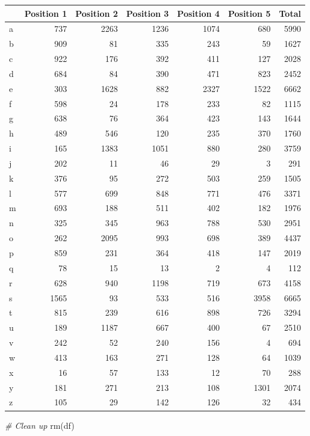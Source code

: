 \documentclass[
]{article}
\newenvironment{Shaded}{\begin{snugshade}}{\end{snugshade}}
\newcommand{\CommentTok}[1]{\textcolor[rgb]{0.56,0.35,0.01}{\textit{#1}}}
\newcommand{\FunctionTok}[1]{\textcolor[rgb]{0.00,0.00,0.00}{#1}}
\newcommand{\NormalTok}[1]{#1}
\begin{document}
\begin{longtable}[]{@{}lrrrrrr@{}}
\toprule
& Position 1 & Position 2 & Position 3 & Position 4 & Position 5 &
Total \\
\midrule
\endhead
a & 737 & 2263 & 1236 & 1074 & 680 & 5990 \\
b & 909 & 81 & 335 & 243 & 59 & 1627 \\
c & 922 & 176 & 392 & 411 & 127 & 2028 \\
d & 684 & 84 & 390 & 471 & 823 & 2452 \\
e & 303 & 1628 & 882 & 2327 & 1522 & 6662 \\
f & 598 & 24 & 178 & 233 & 82 & 1115 \\
g & 638 & 76 & 364 & 423 & 143 & 1644 \\
h & 489 & 546 & 120 & 235 & 370 & 1760 \\
i & 165 & 1383 & 1051 & 880 & 280 & 3759 \\
j & 202 & 11 & 46 & 29 & 3 & 291 \\
k & 376 & 95 & 272 & 503 & 259 & 1505 \\
l & 577 & 699 & 848 & 771 & 476 & 3371 \\
m & 693 & 188 & 511 & 402 & 182 & 1976 \\
n & 325 & 345 & 963 & 788 & 530 & 2951 \\
o & 262 & 2095 & 993 & 698 & 389 & 4437 \\
p & 859 & 231 & 364 & 418 & 147 & 2019 \\
q & 78 & 15 & 13 & 2 & 4 & 112 \\
r & 628 & 940 & 1198 & 719 & 673 & 4158 \\
s & 1565 & 93 & 533 & 516 & 3958 & 6665 \\
t & 815 & 239 & 616 & 898 & 726 & 3294 \\
u & 189 & 1187 & 667 & 400 & 67 & 2510 \\
v & 242 & 52 & 240 & 156 & 4 & 694 \\
w & 413 & 163 & 271 & 128 & 64 & 1039 \\
x & 16 & 57 & 133 & 12 & 70 & 288 \\
y & 181 & 271 & 213 & 108 & 1301 & 2074 \\
z & 105 & 29 & 142 & 126 & 32 & 434 \\
\bottomrule
\end{longtable}

\begin{Shaded}
\begin{Highlighting}[]
\CommentTok{\# Clean up}
\FunctionTok{rm}\NormalTok{(df)}
\end{Highlighting}
\end{Shaded}
\end{document}
